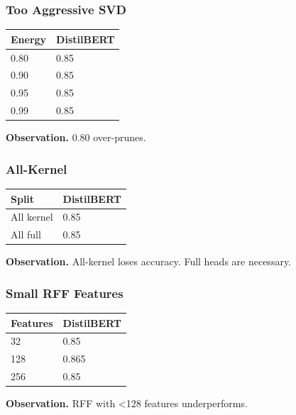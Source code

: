 \subsubsection{Too Aggressive SVD}

\begin{table}[H]
\centering
\small
\begin{tabular}{ll}
\toprule
\textbf{Energy} & \textbf{DistilBERT} \\
\midrule
0.80 & 0.85 \\
0.90 & 0.85 \\
0.95 & 0.85 \\
0.99 & 0.85 \\
\bottomrule
\end{tabular}
\end{table}

\textbf{Observation.} 0.80 over-prunes.

\subsubsection{All-Kernel}

\begin{table}[H]
\centering
\small
\begin{tabular}{ll}
\toprule
\textbf{Split} & \textbf{DistilBERT} \\
\midrule
All kernel & 0.85 \\
All full & 0.85 \\
\bottomrule
\end{tabular}
\end{table}

\textbf{Observation.} All-kernel loses accuracy. Full heads are necessary.

\subsubsection{Small RFF Features}

\begin{table}[H]
\centering
\small
\begin{tabular}{ll}
\toprule
\textbf{Features} & \textbf{DistilBERT} \\
\midrule
32 & 0.85 \\
128 & 0.865 \\
256 & 0.85 \\
\bottomrule
\end{tabular}
\end{table}

\textbf{Observation.} RFF with <128 features underperforms.

